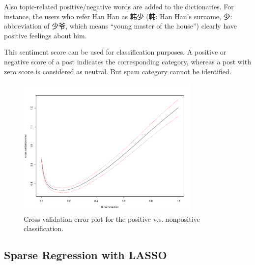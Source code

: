 \documentclass[11pt]{article}
\newcommand{\1}[1]{{\mathbf 1}\left\{#1\right\}}        %
\begin{document}
Also topic-related positive/negative words are added to the dictionaries. For instance, the users who refer Han Han as 韩少 (韩: Han Han's surname, 少: abbreviation of 少爷, which means ``young master of the house'') clearly have positive feelings about him. 


This sentiment score can be used for classification purposes. A positive or negative score of a post indicates the corresponding category, whereas a post with zero score is considered as neutral. But spam category cannot be identified. 

  

\begin{center}
\begin{figure}[tb]
   \centering
   \includegraphics[width=0.8\textwidth]{../lassoResults/CVPosErr.pdf} 
      \caption{Cross-validation error plot for the positive v.s. nonpositive classification. }
   \label{fig:cvplotpos}
\end{figure}
\end{center}

\subsection{Sparse Regression with LASSO}
\end{document}
